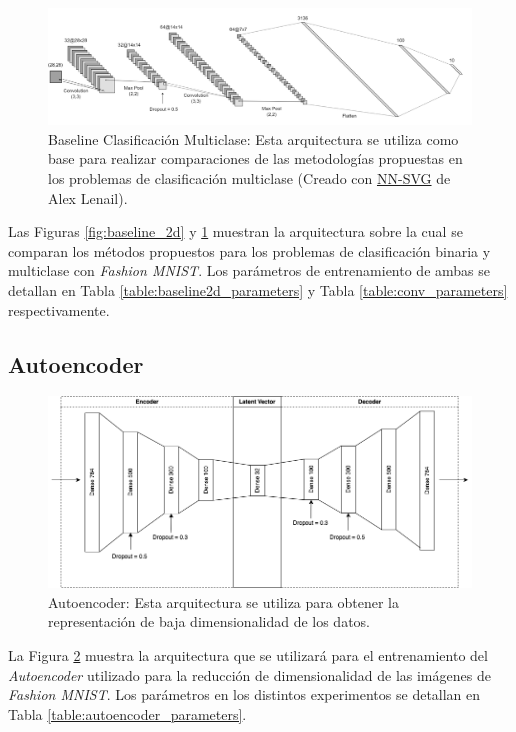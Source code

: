 \begin{figure}[ht]
    \centering
    \includegraphics[width=15cm]{img/tesis/conv.drawio.png}
    \caption{Baseline Clasificación Multiclase: Esta arquitectura se utiliza como base para realizar comparaciones de las metodologías propuestas en los problemas de clasificación multiclase (Creado con \href{http://alexlenail.me/NN-SVG/LeNet.html}{NN-SVG} de Alex Lenail).}
    \label{fig:conv}
\end{figure}

Las Figuras \ref{fig:baseline_2d} y \ref{fig:conv} muestran la arquitectura sobre la cual se comparan los métodos propuestos para los problemas de clasificación binaria y multiclase con \textit{Fashion MNIST}. Los parámetros de entrenamiento de ambas se detallan en Tabla \ref{table:baseline2d_parameters} y Tabla \ref{table:conv_parameters} respectivamente. 

\subsection{Autoencoder}

\begin{figure}[ht]
    \centering
    \includegraphics[width=14cm]{img/tesis/autoencoder_arquitectura.png}
    \caption{Autoencoder: Esta arquitectura se utiliza para obtener la representación de baja dimensionalidad de los datos.}
    \label{fig:autoencoder_arquitectura}
\end{figure}

La Figura \ref{fig:autoencoder_arquitectura} muestra la arquitectura que se utilizará para el entrenamiento del \textit{Autoencoder} utilizado para la reducción de dimensionalidad de las imágenes de \textit{Fashion MNIST}. Los parámetros en los distintos experimentos se detallan en Tabla \ref{table:autoencoder_parameters}.

